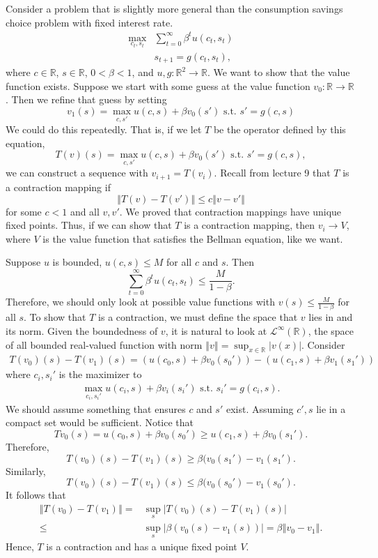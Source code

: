 \documentclass[12pt,reqno]{amsart}
\theoremstyle{definition}
\def\R{\mathbb{R}}
\newcommand{\norm}[1]{\left\Vert {#1} \right\Vert}
\renewcommand{\to}{{\rightarrow}}
\begin{document}
Consider a problem that is slightly more general than the consumption
savings choice problem with fixed interest rate.
\begin{align*}
  \max_{c_t,s_t} & \sum_{t=0}^\infty \beta^t u(c_t,s_t) \\
  & s_{t+1} = g(c_t,s_t),
\end{align*}
where $c \in \R$, $s \in \R$, $0<\beta<1$, and $u,g:\R^2 \to \R$.
We want to show that the value function exists. Suppose we start with
some guess at the value function $v_0:\R\to \R$. Then we refine that guess by
setting 
\[ v_1(s) = \max_{c,s'} u(c,s) + \beta v_0(s') \text{ s.t. }
s'=g(c,s) \]
We could do this repeatedly. That is, if we let $T$ be the operator
defined by this equation,
\[ T(v)(s) = \max_{c,s'} u(c,s) + \beta v_0(s') \text{ s.t. }
s'=g(c,s), \]
we can construct a sequence with $v_{i+1} = T(v_i)$. Recall from
lecture 9 that $T$ is a contraction mapping if 
\[ \norm{T(v) - T(v')} \leq c \norm{v-v'} \] for some $c<1$ and all
$v,v'$. We proved that contraction mappings have unique fixed
points. Thus, if we can show that $T$ is a contraction mapping, then
$v_i \to V$, where $V$ is the value function that satisfies the
Bellman equation, like we want.

Suppose $u$ is bounded, $u(c,s) \leq M$ for all $c$ and $s$. Then 
\[ \sum_{t=0}^\infty \beta^t u(c_t,s_t)  \leq \frac{M}{1-\beta}. \]
Therefore, we should only look at possible value functions with $v(s)
\leq \frac{M}{1-\beta}$ for all $s$. To show that $T$ is a
contraction, we must define the space that $v$ lies in and its
norm. Given the boundedness of $v$, it is natural to look at
$\mathcal{L}^\infty(\R)$, the space of all bounded real-valued function
with norm $\norm{v} = \sup_{x \in \R} |v(x)|$. Consider
\begin{align*}
  T(v_0)(s)-T(v_1)(s) =  \left(u(c_0,s) + \beta v_0(s_0')  \right) -
  \left(u(c_1,s) + \beta v_1(s_1')  \right)
\end{align*} 
where $c_i,s_i'$ is the maximizer to 
\begin{align*}
  \max_{c_i,s_i'} u(c_i,s) + \beta v_i(s_i') \text{ s.t. }
  s_i'=g(c_i,s).
\end{align*}
We should assume something that ensures $c$ and $s'$ exist. Assuming
$c',s$ lie in a compact set would be sufficient. Notice that
\[ T v_0 (s) = u(c_0,s) + \beta v_0(s_0')  \geq u(c_1,s) + \beta
v_0(s_1'). \]
Therefore,
\[ T(v_0)(s) - T(v_1)(s) \geq \beta (v_0(s_1') - v_1(s_1'). \]
Similarly,
\[ T(v_0)(s)-T(v_1)(s) \leq \beta (v_0(s_0') - v_1(s_0'). \]
It follows that
\begin{align*}
  \norm{T(v_0)-T(v_1)} = & \sup_{s} \left\vert T(v_0)(s)-T(v_1)(s) \right\vert \\
  \leq & \sup_s \left\vert \beta(v_0(s) -v_1(s)) \right\vert = \beta
  \norm{v_0 - v_1}.
\end{align*}
Hence, $T$ is a contraction and has a unique fixed point $V$. 
\end{document}
